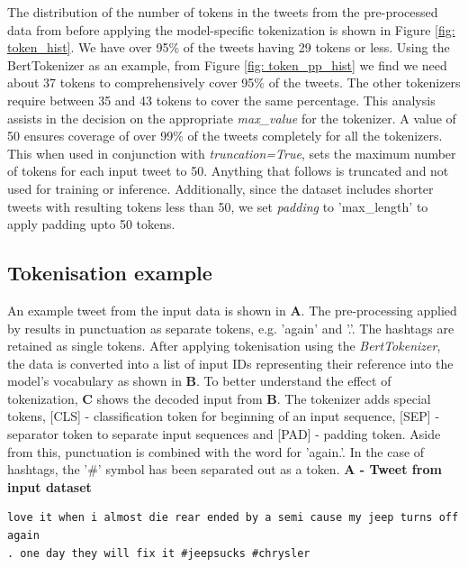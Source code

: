 The distribution of the number of tokens in the tweets from the pre-processed data from \cite{preotiuc-pietro_automatically_2019,jinModelingSeverityComplaints2021} before applying the model-specific tokenization is shown in Figure \ref{fig: token_hist}. We have over 95\% of the tweets having 29 tokens or less. Using the BertTokenizer as an example, from Figure \ref{fig: token_pp_hist} we find we need about 37 tokens to comprehensively cover 95\% of the tweets. The other tokenizers require between 35 and 43 tokens to cover the same percentage. This analysis assists in the decision on the appropriate \textit{max\_value} for the tokenizer. A value of 50 ensures coverage of over 99\% of the tweets completely for all the tokenizers. This when used in conjunction with \textit{truncation=True}, sets the maximum number of tokens for each input tweet to 50. Anything that follows is truncated and not used for training or inference. Additionally, since the dataset includes shorter tweets with resulting tokens less than 50, we set \textit{padding} to 'max\_length' to apply padding upto 50 tokens.


\subsection{Tokenisation example}
An example tweet from the input data is shown in \textbf{A}. The pre-processing applied by \cite{preotiuc-pietro_automatically_2019,jinModelingSeverityComplaints2021} results in punctuation as separate tokens, e.g. 'again' and '.'. The hashtags are retained as single tokens. After applying tokenisation using the \textit{BertTokenizer}, the data is converted into a list of input IDs representing their reference into the model's vocabulary as shown in \textbf{B}. To better understand the effect of tokenization, \textbf{C} shows the decoded input from \textbf{B}. The tokenizer adds special tokens, [CLS] - classification token for beginning of an input sequence, [SEP] - separator token to separate input sequences and [PAD] - padding token. Aside from this, punctuation is combined with the word for 'again.'. In the case of hashtags, the '\#' symbol has been separated out as a token.\newline\newline
\textbf{A - Tweet from input dataset}\newline

\begin{adjustbox}{minipage={\textwidth},fbox}
    \begin{verbatim}love it when i almost die rear ended by a semi cause my jeep turns off again 
. one day they will fix it #jeepsucks #chrysler\end{verbatim}
\end{adjustbox} \newline\newline

